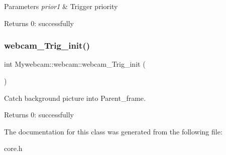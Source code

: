 \begin{DoxyParams}{Parameters}
{\em prior1} & Trigger priority \\
\hline
\end{DoxyParams}
\begin{DoxyReturn}{Returns}
0\+: successfully 
\end{DoxyReturn}
\mbox{\label{class_mywebcam_1_1webcam_a331edce2952af5995420c1ace205317c}} 
\subsubsection{\texorpdfstring{webcam\+\_\+\+Trig\+\_\+init()}{webcam\_Trig\_init()}}
{\footnotesize\ttfamily int Mywebcam\+::webcam\+::webcam\+\_\+\+Trig\+\_\+init (\begin{DoxyParamCaption}{ }\end{DoxyParamCaption})\hspace{0.3cm}{\ttfamily [inline]}}



Catch background picture into Parent\+\_\+frame. 

\begin{DoxyReturn}{Returns}
0\+: successfully 
\end{DoxyReturn}


The documentation for this class was generated from the following file\+:\begin{DoxyCompactItemize}
\item 
core.\+h\end{DoxyCompactItemize}
